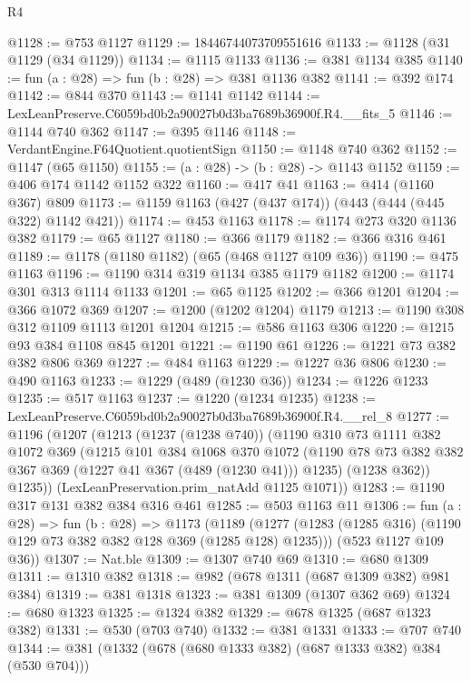 \begin{lexlean}{R4}
\begin{coremodule}
@1128 := @753 @1127
@1129 := 18446744073709551616
@1133 := @1128 (@31 @1129 (@34 @1129))
@1134 := @1115 @1133
@1136 := @381 @1134 @385
@1140 := fun (a : @28) => fun (b : @28) => @381 @1136 @382
@1141 := @392 @174
@1142 := @844 @370
@1143 := @1141 @1142
@1144 := LexLeanPreserve.C6059bd0b2a90027b0d3ba7689b36900f.R4.__fits_5
@1146 := @1144 @740 @362
@1147 := @395 @1146
@1148 := VerdantEngine.F64Quotient.quotientSign
@1150 := @1148 @740 @362
@1152 := @1147 (@65 @1150)
@1155 := (a : @28) -> (b : @28) -> @1143 @1152
@1159 := @406 @174 @1142 @1152 @322
@1160 := @417 @41
@1163 := @414 (@1160 @367) @809
@1173 := @1159 @1163 (@427 (@437 @174)) (@443 (@444 (@445 @322) @1142 @421))
@1174 := @453 @1163
@1178 := @1174 @273 @320 @1136 @382
@1179 := @65 @1127
@1180 := @366 @1179
@1182 := @366 @316 @461
@1189 := @1178 (@1180 @1182) (@65 (@468 @1127 @109 @36))
@1190 := @475 @1163
@1196 := @1190 @314 @319 @1134 @385 @1179 @1182
@1200 := @1174 @301 @313 @1114 @1133
@1201 := @65 @1125
@1202 := @366 @1201
@1204 := @366 @1072 @369
@1207 := @1200 (@1202 @1204) @1179
@1213 := @1190 @308 @312 @1109 @1113 @1201 @1204
@1215 := @586 @1163 @306
@1220 := @1215 @93 @384 @1108 @845 @1201
@1221 := @1190 @61
@1226 := @1221 @73 @382 @382 @806 @369
@1227 := @484 @1163
@1229 := @1227 @36 @806
@1230 := @490 @1163
@1233 := @1229 (@489 (@1230 @36))
@1234 := @1226 @1233
@1235 := @517 @1163
@1237 := @1220 (@1234 @1235)
@1238 := LexLeanPreserve.C6059bd0b2a90027b0d3ba7689b36900f.R4.__rel_8
@1277 := @1196
    (@1207
      (@1213
        (@1237 (@1238 @740))
        (@1190
          @310
          @73
          @1111
          @382
          @1072
          @369
          (@1215
            @101
            @384
            @1068
            @370
            @1072
            (@1190 @78 @73 @382 @382 @367 @369 (@1227 @41 @367 (@489 (@1230 @41))) @1235)
            (@1238 @362))
          @1235))
      (LexLeanPreservation.prim_natAdd @1125 @1071))
@1283 := @1190 @317 @131 @382 @384 @316 @461
@1285 := @503 @1163 @11
@1306 := fun (a : @28) =>
  fun (b : @28) =>
  @1173
    (@1189
      (@1277 (@1283 (@1285 @316) (@1190 @129 @73 @382 @382 @128 @369 (@1285 @128) @1235)))
      (@523 @1127 @109 @36))
@1307 := Nat.ble
@1309 := @1307 @740 @69
@1310 := @680 @1309
@1311 := @1310 @382
@1318 := @982 (@678 @1311 (@687 @1309 @382) @981 @384)
@1319 := @381 @1318
@1323 := @381 @1309 (@1307 @362 @69)
@1324 := @680 @1323
@1325 := @1324 @382
@1329 := @678 @1325 (@687 @1323 @382)
@1331 := @530 (@703 @740)
@1332 := @381 @1331
@1333 := @707 @740
@1344 := @381 (@1332 (@678 (@680 @1333 @382) (@687 @1333 @382) @384 (@530 @704)))

\end{coremodule}
\end{lexlean}
